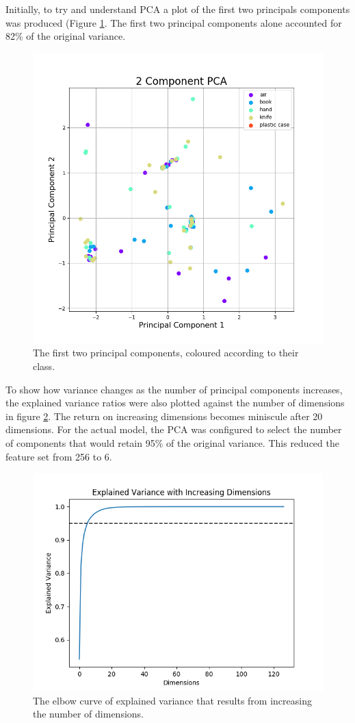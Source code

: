 \documentclass[12pt]{article}
\begin{document}
Initially, to try and understand PCA a plot of the first two principals components was produced (Figure \ref{fig:pca1}. The first two principal components alone accounted for 82\% of the original variance.

\begin{figure}[!ht]
	\centering
	\includegraphics[width=0.8\linewidth]{images/2dpca}
	\caption{The first two principal components, coloured according to their class.}
	\label{fig:pca1}
\end{figure}

To show how variance changes as the number of principal components increases, the explained variance ratios were also plotted against the number of dimensions in figure \ref{fig:explainedvariance}. The return on increasing dimensions becomes miniscule after 20 dimensions.
For the actual model, the PCA was configured to select the number of components that would retain 95\% of the original variance. This reduced the feature set from 256 to 6.

\begin{figure}[!ht]
	\centering
	\includegraphics[width=0.8\linewidth]{images/explainedvariance}
	\caption{The elbow curve of explained variance that results from increasing the number of dimensions.}
	\label{fig:explainedvariance}
\end{figure}
\end{document}
